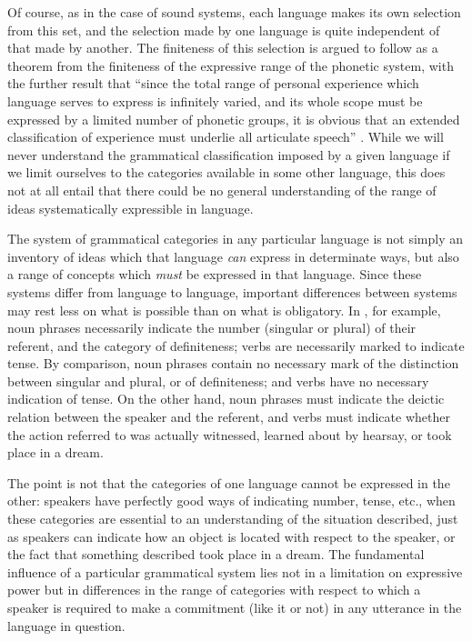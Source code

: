 Of course, as in the case of sound systems, each language makes its
own selection from this set, and the selection made by one language is
quite independent of that made by another. The finiteness of this
selection is argued to follow as a theorem from the finiteness of the
expressive range of the phonetic system, with the further result that
``since the total range of personal experience which language serves to
express is infinitely varied, and its whole scope must be expressed by
a limited number of phonetic groups, it is obvious that an extended
classification of experience must underlie all articulate speech''
\citep[24]{boas11:introduction}. While we will never understand the
grammatical classification imposed by a given language if we limit
ourselves to the categories available in some other language, this
does not at all entail that there could be no general understanding of
the range of ideas systematically expressible in language.

The system of grammatical categories in any particular language is not
simply an inventory of ideas which that language \emph{can} express in
determinate ways, but also a range of concepts which \emph{must} be
expressed in that language. Since these systems differ from language
to language, important differences between systems may rest less on
what is possible than on what is obligatory. In , for example,
noun phrases necessarily indicate the number (singular or plural) of
their referent, and the category of definiteness; verbs are
necessarily marked to indicate tense. By comparison,  noun
phrases contain no necessary mark of the distinction between singular
and plural, or of definiteness; and  verbs have no necessary
indication of tense. On the other hand,  noun phrases must
indicate the deictic relation between the speaker and the referent,
and  verbs must indicate whether the action referred to was
actually witnessed, learned about by hearsay, or took place in a
dream.

The point is not that the categories of one language cannot be
expressed in the other:  speakers have perfectly good ways of
indicating number, tense, etc., when these categories are essential to
an understanding of the situation described, just as  speakers
can indicate how an object is located with respect to the speaker, or
the fact that something described took place in a dream. The
fundamental influence of a particular grammatical system lies not in a
limitation on expressive power but in differences in the range of
categories with respect to which a speaker is required to make a commitment
(like it or not) in any utterance in the language in question.

